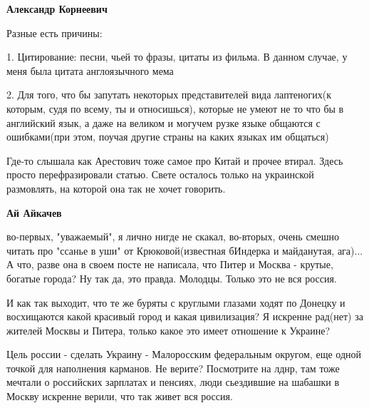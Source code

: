 \begin{itemize}
\begin{itemize}
 
\textbf{Александр Корнеевич} 

Разные есть причины: 

1. Цитирование: песни, чьей то фразы, цитаты из фильма. В данном случае, у меня
была цитата англоязычного мема 

2. Для того, что бы запутать некоторых представителей вида лаптеногих(к
которым, судя по всему, ты и относишься), которые не умеют не то что бы в
английский язык, а даже на великом и могучем рузке языке общаются с
ошибками(при этом, поучая другие страны на каких языках им общаться)

 
Где-то слышала как Арестович тоже самое про Китай и прочее втирал. Здесь просто перефразировали статью. Свете осталось только на украинской размовлять, на которой она так не хочет говорить.

 
\textbf{Ай Айкачев} 

во-первых, "уважаемый", я лично нигде не скакал, во-вторых, очень смешно читать
про "ссанье в уши" от Крюковой(известная бИндерка и майданутая, ага)... А что,
разве она в своем посте не написала, что Питер и Москва - крутые, богатые
города? Ну так да, это правда. Молодцы. Только это не вся россия. 

И как так выходит, что те же буряты с круглыми глазами ходят по Донецку и
восхищаются какой красивый город и какая цивилизация? Я искренне рад(нет) за
жителей Москвы и Питера, только какое это имеет отношение к Украине? 

Цель россии - сделать Украину - Малоросским федеральным округом, еще одной
точкой для наполнения карманов. Не верите? Посмотрите на лднр, там тоже мечтали
о российских зарплатах и пенсиях, люди сьездившие на шабашки в Москву искренне
верили, что так живет вся россия. 


\end{itemize}
\end{itemize}
